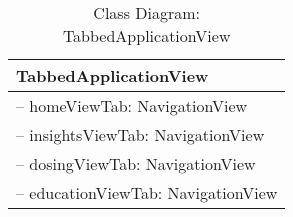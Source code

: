 \begin{table}[ht]
\centering
\caption{Class Diagram: TabbedApplicationView}

\hspace{1em}
\renewcommand{\arraystretch}{1.7}

\begin{tabular}{|l|}
\hline
\textbf{TabbedApplicationView} \\
\hline
– homeViewTab: NavigationView \\
– insightsViewTab: NavigationView \\
– dosingViewTab: NavigationView \\
– educationViewTab: NavigationView \\
\hline
\end{tabular}
\end{table}
